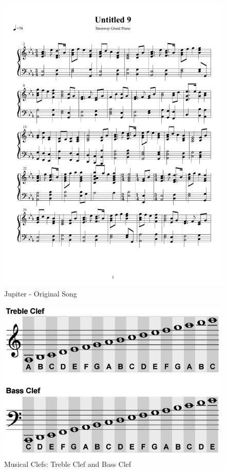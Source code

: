 \documentclass{article} %
\begin{document}
 \begin{figure}[H]
\centering

\includegraphics [scale = 0.6] {JupiterOriginal-cropped.pdf}
\caption{Jupiter - Original Song\label{Jorig}}
\end{figure}

\begin{figure}[H]
\centering

\includegraphics [scale = 0.6] {clef.jpg}
\caption{Musical Clefs: Treble Clef and Bass Clef\label{keys}}
\end{figure}
\end{document}
